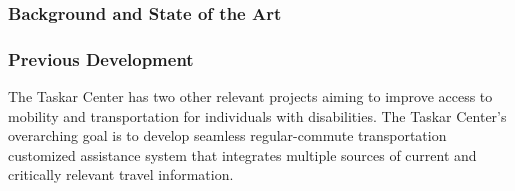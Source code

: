 

\subsubsection{Background and State of the Art}

\subsubsection{Previous Development}
\label{sec:prev-devel-access}
The Taskar Center has two other relevant projects aiming to improve access to mobility and transportation for individuals with disabilities. The Taskar Center's overarching goal is 
to develop seamless regular-commute transportation customized assistance system that integrates multiple sources of current and critically relevant travel information.

